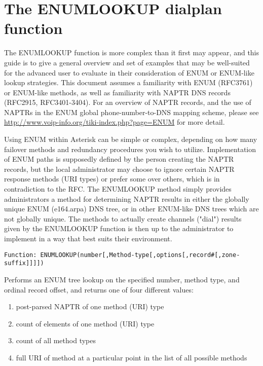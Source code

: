 \section{The ENUMLOOKUP dialplan function}

The ENUMLOOKUP function is more complex than it first may appear, and
this guide is to give a general overview and set of examples that may
be well-suited for the advanced user to evaluate in their
consideration of ENUM or ENUM-like lookup strategies.  This document
assumes a familiarity with ENUM (RFC3761) or ENUM-like methods, as
well as familiarity with NAPTR DNS records (RFC2915, RFC3401-3404).
For an overview of NAPTR records, and the use of NAPTRs in the ENUM
global phone-number-to-DNS mapping scheme, please see
\url{http://www.voip-info.org/tiki-index.php?page=ENUM} for more detail.

Using ENUM within Asterisk can be simple or complex, depending on how
many failover methods and redundancy procedures you wish to utilize.
Implementation of ENUM paths is supposedly defined by the person
creating the NAPTR records, but the local administrator may choose to
ignore certain NAPTR response methods (URI types) or prefer some over
others, which is in contradiction to the RFC.  The ENUMLOOKUP method
simply provides administrators a method for determining NAPTR results
in either the globally unique ENUM (e164.arpa) DNS tree, or in other
ENUM-like DNS trees which are not globally unique.  The methods to
actually create channels ("dial") results given by the ENUMLOOKUP
function is then up to the administrator to implement in a way that
best suits their environment.

\begin{verbatim}
Function: ENUMLOOKUP(number[,Method-type[,options[,record#[,zone-suffix]]]])
\end{verbatim}

  Performs an ENUM tree lookup on the specified number, method type, and
  ordinal record offset, and returns one of four different values:

\begin{enumerate}
   \item post-parsed NAPTR of one method (URI) type
   \item count of elements of one method (URI) type
   \item count of all method types
   \item full URI of method at a particular point in the list of all possible methods
\end{enumerate}

